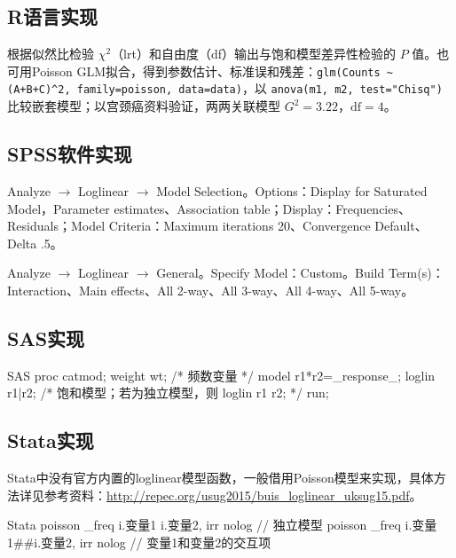 \subsection{R语言实现}
\par\noindent
{}
\par
根据似然比检验 $\chi^2$（lrt）和自由度（df）输出与饱和模型差异性检验的 $P$ 值。也可用Poisson GLM拟合，得到参数估计、标准误和残差：\texttt{glm(Counts \textasciitilde{} (A+B+C)\^{}2, family=poisson, data=data)}，以 \texttt{anova(m1, m2, test="Chisq")} 比较嵌套模型；以宫颈癌资料验证，两两关联模型 $G^2=3.22$，$\mathrm{df}=4$。
\subsection{SPSS软件实现}
Analyze $\to$ Loglinear $\to$ Model Selection。Options：Display for Saturated Model，Parameter estimates、Association table；Display：Frequencies、Residuals；Model Criteria：Maximum iterations 20、Convergence Default、Delta .5。

Analyze $\to$ Loglinear $\to$ General。Specify Model：Custom。Build Term(s)：Interaction、Main effects、All 2-way、All 3-way、All 4-way、All 5-way。
\subsection{SAS实现}
\par\noindent
\begin{coursecode}{SAS}
proc catmod;
  weight wt;               /* 频数变量 */
  model r1*r2=_response_;
  loglin r1|r2;            /* 饱和模型；若为独立模型，则 loglin r1 r2; */
run;
\end{coursecode}
\par
\subsection{Stata实现}
Stata中没有官方内置的loglinear模型函数，一般借用Poisson模型来实现，具体方法详见参考资料：\url{http://repec.org/usug2015/buis_loglinear_uksug15.pdf}。
\par\noindent
\begin{coursecode}{Stata}
poisson _freq i.变量1 i.变量2, irr nolog      // 独立模型
poisson _freq i.变量1##i.变量2, irr nolog     // 变量1和变量2的交互项
\end{coursecode}
\par

